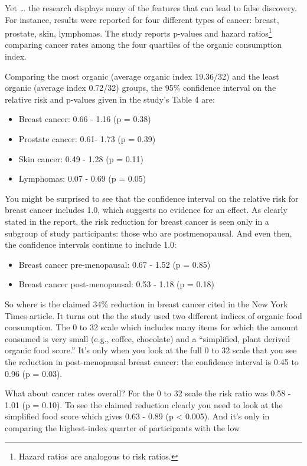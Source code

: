 \documentclass[
  letterpaper,
  DIV=11,
  numbers=noendperiod,
  oneside]{scrreprt}
\providecommand{\tightlist}{%
  \setlength{\itemsep}{0pt}\setlength{\parskip}{0pt}}\usepackage{longtable,booktabs,array}
\begin{document}
Yet \ldots{} the research displays many of the features that can lead to
false discovery. For instance, results were reported for four different
types of cancer: breast, prostate, skin, lymphomas. The study reports
p-values and hazard ratios\footnote{Hazard ratios are analogous to risk
  ratios.} comparing cancer rates among the four quartiles of the
organic consumption index.

Comparing the most organic (average organic index 19.36/32) and the
least organic (average index 0.72/32) groups, the 95\% confidence
interval on the relative risk and p-values given in the study's Table 4
are:

\begin{itemize}
\tightlist
\item
  Breast cancer: 0.66 - 1.16 (p = 0.38)
\item
  Prostate cancer: 0.61- 1.73 (p = 0.39)
\item
  Skin cancer: 0.49 - 1.28 (p = 0.11)
\item
  Lymphomas: 0.07 - 0.69 (p = 0.05)
\end{itemize}

You might be surprised to see that the confidence interval on the
relative risk for breast cancer includes 1.0, which suggests no evidence
for an effect. As clearly stated in the report, the risk reduction for
breast cancer is seen only in a subgroup of study participants: those
who are postmenopausal. And even then, the confidence intervals continue
to include 1.0:

\begin{itemize}
\tightlist
\item
  Breast cancer pre-menopausal: 0.67 - 1.52 (p = 0.85)
\item
  Breast cancer post-menopausal: 0.53 - 1.18 (p = 0.18)
\end{itemize}

So where is the claimed 34\% reduction in breast cancer cited in the New
York Times article. It turns out the the study used two different
indices of organic food consumption. The 0 to 32 scale which includes
many items for which the amount consumed is very small (e.g., coffee,
chocolate) and a ``simplified, plant derived organic food score.'' It's
only when you look at the full 0 to 32 scale that you see the reduction
in post-menopausal breast cancer: the confidence interval is 0.45 to
0.96 (p = 0.03).

What about cancer rates overall? For the 0 to 32 scale the risk ratio
was 0.58 - 1.01 (p = 0.10). To see the claimed reduction clearly you
need to look at the simplified food score which gives 0.63 - 0.89 (p
\textless{} 0.005). And it's only in comparing the highest-index quarter
of participants with the low
\end{document}
